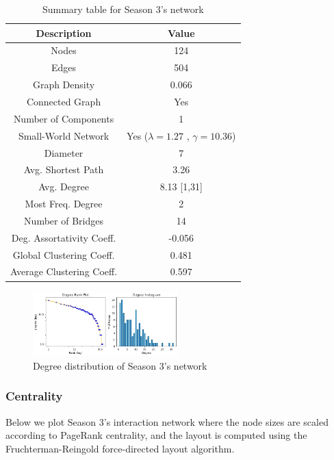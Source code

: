 \documentclass[10pt,twocolumn,letterpaper]{article}
\begin{document}
\begin{table}[!h]
    \centering
    \small
    \begin{tabular}{c|c}
        Description & Value  \\
        \hline
        Nodes & 124 \\
        Edges & 504 \\
        Graph Density & 0.066 \\
        Connected Graph & Yes \\
        Number of Components & 1 \\
        Small-World Network & Yes ($\lambda=1.27$ , $\gamma=10.36$) \\
        Diameter & 7 \\
        Avg. Shortest Path & 3.26 \\
        Avg. Degree & 8.13 [1,31] \\
        Most Freq. Degree & 2 \\
        Number of Bridges & 14 \\
        Deg. Assortativity Coeff. & -0.056\\
        Global Clustering Coeff. & 0.481 \\
        Average Clustering Coeff. & 0.597 \\
        \hline 
    \end{tabular}
    \vspace{0.2cm}
    \caption{Summary table for Season 3's network}
    \label{tab:my_label}
\end{table} 

\begin{figure}[!h]
    \centering
    \includegraphics[width=0.5\textwidth]{img/s3/degree_plot.jpg}
    \caption{\small{Degree distribution of Season 3's network}}
\end{figure}

\subsubsection{Centrality}

Below we plot Season 3’s interaction network where the node sizes are scaled according to PageRank centrality, and the layout is computed using the Fruchterman-Reingold force-directed layout algorithm.
\end{document}
